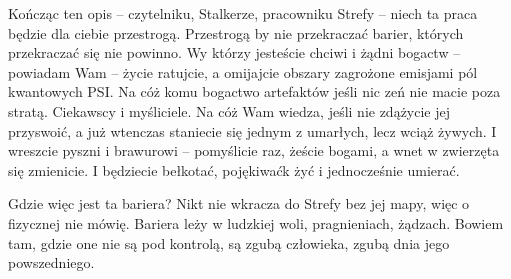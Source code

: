 \documentclass[../MAIN.tex]{subfiles}
\begin{document}
Kończąc ten opis -- czytelniku, Stalkerze, pracowniku Strefy -- niech ta praca będzie dla ciebie przestrogą. Przestrogą by nie przekraczać barier, których przekraczać się nie powinno. Wy którzy jesteście chciwi i żądni bogactw -- powiadam Wam -- życie ratujcie, a omijajcie obszary zagrożone emisjami pól kwantowych PSI. Na cóż komu bogactwo artefaktów jeśli nic zeń nie macie poza stratą. Ciekawscy i myśliciele. Na cóż Wam wiedza, jeśli nie zdążycie jej przyswoić, a już wtenczas staniecie się jednym z umarłych, lecz wciąż żywych. I wreszcie pyszni i brawurowi -- pomyślicie raz, żeście bogami, a wnet w zwierzęta się zmienicie. I będziecie bełkotać, pojękiwać\3k żyć i jednocześnie umierać.

Gdzie więc jest ta bariera? Nikt nie wkracza do Strefy bez jej mapy, więc o fizycznej nie mówię. Bariera leży w ludzkiej woli, pragnieniach, żądzach. Bowiem tam, gdzie one nie są pod kontrolą, są zgubą człowieka, zgubą dnia jego powszedniego.
\end{document}
